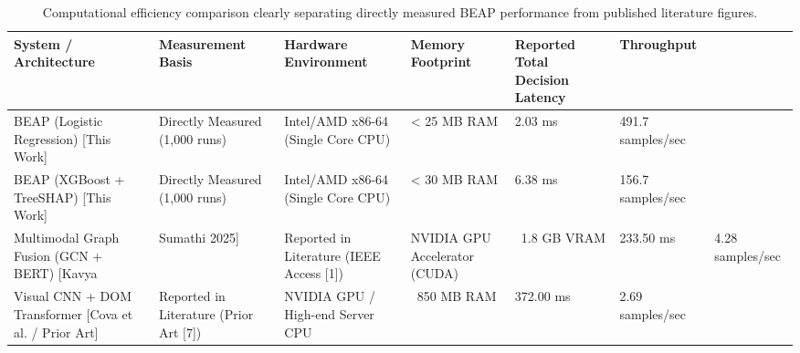 \begin{table}
\caption{Computational efficiency comparison clearly separating directly measured BEAP performance from published literature figures.}
\label{tab:latency_benchmark}
\begin{tabular}{llllll}
\toprule
System / Architecture & Measurement Basis & Hardware Environment & Memory Footprint & Reported Total Decision Latency & Throughput \\
\midrule
BEAP (Logistic Regression) [This Work] & Directly Measured (1,000 runs) & Intel/AMD x86-64 (Single Core CPU) & < 25 MB RAM & 2.03 ms & 491.7 samples/sec \\
BEAP (XGBoost + TreeSHAP) [This Work] & Directly Measured (1,000 runs) & Intel/AMD x86-64 (Single Core CPU) & < 30 MB RAM & 6.38 ms & 156.7 samples/sec \\
Multimodal Graph Fusion (GCN + BERT) [Kavya & Sumathi 2025] & Reported in Literature (IEEE Access [1]) & NVIDIA GPU Accelerator (CUDA) & ~1.8 GB VRAM & 233.50 ms & 4.28 samples/sec \\
Visual CNN + DOM Transformer [Cova et al. / Prior Art] & Reported in Literature (Prior Art [7]) & NVIDIA GPU / High-end Server CPU & ~850 MB RAM & 372.00 ms & 2.69 samples/sec \\
\bottomrule
\end{tabular}
\end{table}
